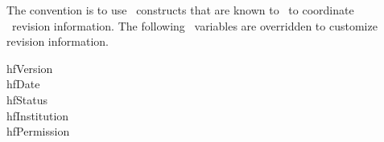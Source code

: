 \begin{description}
  \item[\fcName] The convention is to use \ahf\ constructs that are known to
    \tlcarticle\ to coordinate \docControl\ revision information. The following
    \ahf\ variables are overridden to customize revision information.

  \begin{description}
    \item[hfVersion] \hfVersion%
    \item[hfDate] \hfDate%
    \item[hfStatus] \hfStatus%
    \item[hfInstitution] \hfInstitution%
    \item[hfPermission] \hfPermission%
  \end{description}
\end{description}
